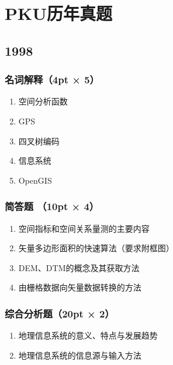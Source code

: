 \documentclass[]{article}
\date{}
\begin{document}
\hypertarget{header-n0}{%
\section{PKU历年真题}\label{header-n0}}

\hypertarget{header-n2}{%
\subsection{1998}\label{header-n2}}

\hypertarget{header-n3}{%
\subsubsection{名词解释（4pt × 5）}\label{header-n3}}

\begin{enumerate}
\def\labelenumi{\arabic{enumi}.}
\item
  空间分析函数
\item
  GPS
\item
  四叉树编码
\item
  信息系统
\item
  OpenGIS
\end{enumerate}

\hypertarget{header-n15}{%
\subsubsection{简答题 （10pt × 4）}\label{header-n15}}

\begin{enumerate}
\def\labelenumi{\arabic{enumi}.}
\item
  空间指标和空间关系量测的主要内容
\item
  矢量多边形面积的快速算法（要求附框图）
\item
  DEM、DTM的概念及其获取方法
\item
  由栅格数据向矢量数据转换的方法
\end{enumerate}

\hypertarget{header-n25}{%
\subsubsection{综合分析题（20pt × 2）}\label{header-n25}}

\begin{enumerate}
\def\labelenumi{\arabic{enumi}.}
\item
  地理信息系统的意义、特点与发展趋势
\item
  地理信息系统的信息源与输入方法
\end{enumerate}
\end{document}
